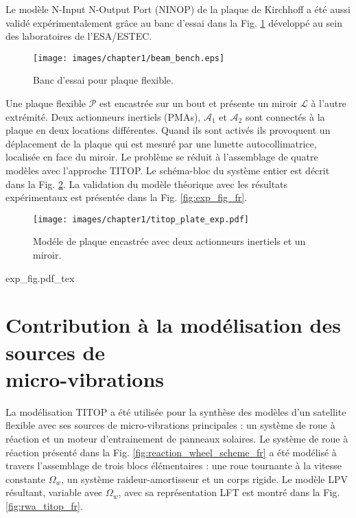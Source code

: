 Le modèle N-Input N-Output Port (NINOP) de la plaque de Kirchhoff a été aussi validé expérimentalement grâce au banc d’essai dans la Fig. \ref{fig:beam_bench_fr} développé au sein des laboratoires de l’ESA/ESTEC. 

\begin{figure}[!ht]
\centering
\texttt{[image: images/chapter1/beam\_bench.eps]} %
\caption{Banc d'essai pour plaque flexible.} 
\label{fig:beam_bench_fr}
\end{figure}

Une plaque flexible $\mathcal{P}$ est encastrée sur un bout et présente un miroir $\mathcal{L}$ à l’autre extrémité. Deux actionneurs inertiels (PMAs), $\mathcal{A}_1$ et $\mathcal{A}_2$ sont connectés à la plaque en deux locations différentes. Quand ils sont activés ils provoquent un déplacement de la plaque qui est mesuré par une lunette autocollimatrice, localisée en face du miroir. Le problème se réduit à l’assemblage de quatre modèles avec l’approche TITOP. 
Le schéma-bloc du système entier est décrit dans la Fig. \ref{fig:titop_plate_exp_fr}. La validation du modèle théorique avec les résultats expérimentaux est présentée dans la Fig. \ref{fig:exp_fig_fr}.
\begin{figure}[!ht]
\centering
\texttt{[image: images/chapter1/titop\_plate\_exp.pdf]} %
\caption{Modéle de plaque encastrée avec deux actionneurs inertiels et un miroir.} 
\label{fig:titop_plate_exp_fr}
\end{figure}
\begin{figure*}[!th]
    \centering
    \def\svgwidth{\textwidth}
    {
    \small
    {exp_fig.pdf_tex}
    }
    \caption{Comparaison entre modèles expérimental et analytique : $u_1\rightarrow \mathbf{q}_{S}(2)$ (à gauche), $u_2\rightarrow \mathbf{q}_{S}(2)$ (à droite).}
\label{fig:exp_fig_fr}
\end{figure*}

\section[Mod\'elisation sources de micro-vibrations]{Contribution \`a la mod\'elisation des sources de \\ micro-vibrations}

La modélisation TITOP a été utilisée pour la synthèse des modèles d’un satellite flexible avec ses sources de micro-vibrations principales : un système de roue à réaction et un moteur d’entrainement de panneaux solaires. 
Le système de roue à réaction présenté dans la Fig. \ref{fig:reaction_wheel_scheme_fr} a été modélisé à travers l’assemblage de trois blocs élémentaires : une roue tournante à la vitesse constante $\Omega_w$, un système raideur-amortisseur et un corps rigide. Le modèle LPV résultant, variable avec $\Omega_w$, avec sa représentation LFT est montré dans la Fig. \ref{fig:rwa_titop_fr}.


